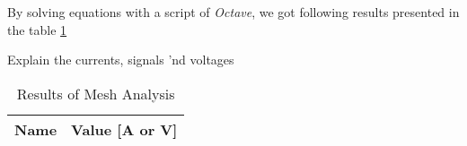 By solving equations with a script of \textit{Octave}, we got following results presented in the table \ref{tab:op_octave_mesh}

Explain the currents, signals 'nd voltages

\begin{table}[h]
  \centering
  \begin{tabular}{|l|r|}
    \hline
    {\bf Name} & {\bf Value [A or V]} \\ \hline
    
  \end{tabular}
  \caption{Results of Mesh Analysis}
  \label{tab:op_octave_mesh}
\end{table}




